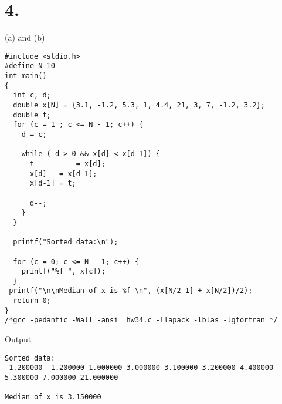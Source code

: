 \documentclass{article}\usepackage[]{graphicx}\usepackage[]{color}
\begin{document}
\section*{4.}
(a) and (b)
\begin{verbatim}
#include <stdio.h>
#define N 10 
int main()
{
  int c, d;
  double x[N] = {3.1, -1.2, 5.3, 1, 4.4, 21, 3, 7, -1.2, 3.2};
  double t;
  for (c = 1 ; c <= N - 1; c++) {
    d = c;
 
    while ( d > 0 && x[d] < x[d-1]) {
      t          = x[d];
      x[d]   = x[d-1];
      x[d-1] = t;
 
      d--;
    }
  }
 
  printf("Sorted data:\n");
 
  for (c = 0; c <= N - 1; c++) {
    printf("%f ", x[c]);
  }
 printf("\n\nMedian of x is %f \n", (x[N/2-1] + x[N/2])/2);
  return 0;
}
/*gcc -pedantic -Wall -ansi  hw34.c -llapack -lblas -lgfortran */
\end{verbatim}

Output 
\begin{verbatim}
Sorted data:
-1.200000 -1.200000 1.000000 3.000000 3.100000 3.200000 4.400000 5.300000 7.000000 21.000000 

Median of x is 3.150000 

\end{verbatim}
\end{document}
